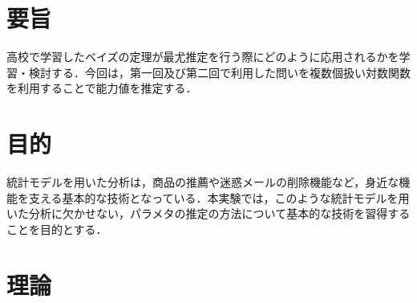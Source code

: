 \documentclass[12pt]{jarticle}
\begin{document}



\section{要旨}
高校で学習したベイズの定理が最尤推定を行う際にどのように応用されるかを学習・検討する．今回は，第一回及び第二回で利用した問いを複数個扱い対数関数を利用することで能力値を推定する．

\section{目的}
統計モデルを用いた分析は，商品の推薦や迷惑メールの削除機能など，身近な機能を支える基本的な技術となっている．本実験では，このような統計モデルを用いた分析に欠かせない，パラメタの推定の方法について基本的な技術を習得することを目的とする．

\section{理論}
\end{document}
